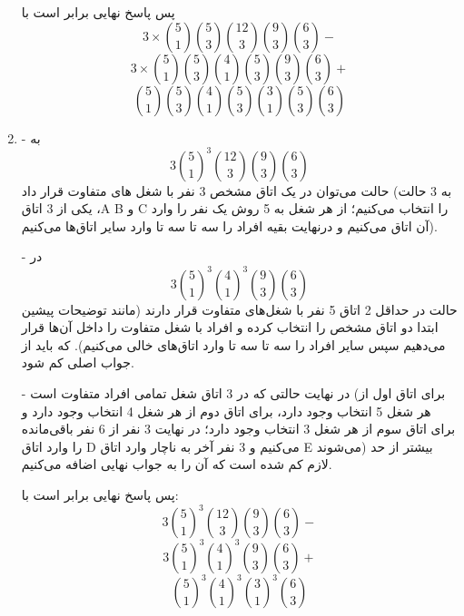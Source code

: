 \begin{enumerate}
    پس پاسخ نهایی برابر است با
    $$3\times\binom{5}{1}\binom{5}{3}\binom{12}{3}\binom{9}{3}\binom{6}{3}-$$
    $$3\times\binom{5}{1}\binom{5}{3}\binom{4}{1}\binom{5}{3}\binom{9}{3}\binom{6}{3}+$$
    $$\binom{5}{1}\binom{5}{3}\binom{4}{1}\binom{5}{3}\binom{3}{1}\binom{5}{3}\binom{6}{3}$$

    \item
    -
    به
    $$3\binom{5}{1}^3\binom{12}{3}\binom{9}{3}\binom{6}{3}$$
    حالت می‌توان در یک اتاق مشخص 3 نفر با شغل های متفاوت قرار داد (به 3 حالت یکی از 3 اتاق  ،A B و C را انتخاب می‌کنیم؛ از هر شغل به 5 روش یک نفر را وارد آن اتاق می‌کنیم و در‌نهایت بقیه افراد را سه تا سه تا وارد سایر اتاق‌ها می‌کنیم).

    -
    در
    $$3\binom{5}{1}^3\binom{4}{1}^3\binom{9}{3}\binom{6}{3}$$
    حالت در حداقل 2 اتاق 5 نفر با شغل‌های متفاوت قرار دارند (مانند توضیحات پیشین ابتدا دو اتاق مشخص را انتخاب کرده و افراد با شغل متفاوت را داخل آن‌ها قرار می‌دهیم سپس سایر افراد را سه تا سه تا وارد اتاق‌های خالی می‌کنیم). که باید از جواب اصلی کم شود.
    
    -
    در نهایت حالتی که در 3 اتاق شغل تمامی افراد متفاوت است (برای اتاق اول از هر شغل 5 انتخاب وجود دارد، برای اتاق دوم از هر شغل 4 انتخاب وجود دارد و برای اتاق سوم از هر شغل 3 انتخاب وجود دارد؛ در نهایت 3 نفر از 6 نفر باقی‌مانده را وارد اتاق D می‌کنیم و 3 نفر آخر به ناچار وارد اتاق E می‌شوند) بیشتر از حد لازم کم شده است که آن را به جواب نهایی اضافه می‌کنیم.
    
    پس پاسخ نهایی برابر است با:
    $$3\binom{5}{1}^3\binom{12}{3}\binom{9}{3}\binom{6}{3}-$$
    $$3\binom{5}{1}^3\binom{4}{1}^3\binom{9}{3}\binom{6}{3}+$$
    $$\binom{5}{1}^3\binom{4}{1}^3\binom{3}{1}^3\binom{6}{3}$$
\end{enumerate}